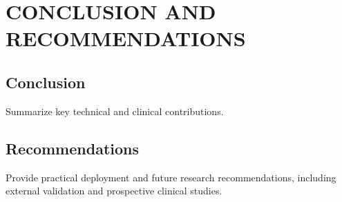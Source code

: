 \documentclass[12pt,a4paper]{report}
\begin{document}
\chapter{CONCLUSION AND RECOMMENDATIONS}
\section{Conclusion}
Summarize key technical and clinical contributions.

\section{Recommendations}
Provide practical deployment and future research recommendations, including external validation and prospective clinical studies.

\clearpage


\end{document}
